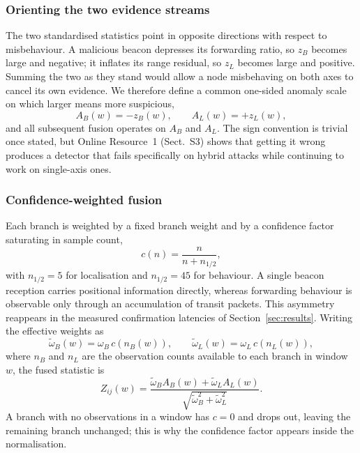 \documentclass[pdflatex,sn-mathphys-num]{sn-jnl}%
\theoremstyle{thmstyleone}%
\theoremstyle{thmstyletwo}%
\theoremstyle{thmstylethree}%
\begin{document}
\subsubsection{Orienting the two evidence streams}

The two standardised statistics point in opposite directions with respect to
misbehaviour. A malicious beacon depresses its forwarding ratio, so $z_B$
becomes large and negative; it inflates its range residual, so $z_L$ becomes
large and positive. Summing the two as they stand would allow a node
misbehaving on both axes to cancel its own evidence. We therefore define a
common one-sided anomaly scale on which larger means more suspicious,
\begin{equation}
\label{eq:orient}
A_B(w) = -z_B(w), \qquad A_L(w) = +z_L(w),
\end{equation}
and all subsequent fusion operates on $A_B$ and $A_L$. The sign convention is
trivial once stated, but Online Resource~1 (Sect.~S3) shows that getting it
wrong produces a detector that fails specifically on hybrid attacks while
continuing to work on single-axis ones.

\subsubsection{Confidence-weighted fusion}

Each branch is weighted by a fixed branch weight and by a confidence factor
saturating in sample count,
\begin{equation}
\label{eq:conf}
c(n) = \frac{n}{n + n_{1/2}},
\end{equation}
with $n_{1/2} = 5$ for localisation and $n_{1/2} = 45$ for behaviour. A single
beacon reception carries positional information directly, whereas forwarding
behaviour is observable only through an accumulation of transit packets. This
asymmetry reappears in the measured confirmation latencies of
Section~\ref{sec:results}. Writing the effective weights as
\begin{equation}
\label{eq:effw}
\tilde\omega_B(w) = \omega_B\, c(n_B(w)), \qquad
\tilde\omega_L(w) = \omega_L\, c(n_L(w)),
\end{equation}
where $n_B$ and $n_L$ are the observation counts available to each branch in
window $w$, the fused statistic is
\begin{equation}
\label{eq:stouffer}
Z_{ij}(w) = \frac{\tilde\omega_B A_B(w) + \tilde\omega_L A_L(w)}
                 {\sqrt{\tilde\omega_B^2 + \tilde\omega_L^2}}.
\end{equation}
A branch with no observations in a window has $c = 0$ and drops out, leaving
the remaining branch unchanged; this is why the confidence factor appears
inside the normalisation.
\end{document}
